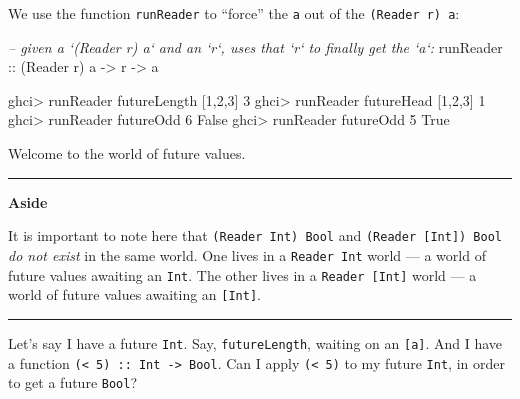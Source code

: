 \documentclass[]{article}
\newenvironment{Shaded}{}{}
\newcommand{\DataTypeTok}[1]{\textcolor[rgb]{0.56,0.13,0.00}{#1}}
\newcommand{\DecValTok}[1]{\textcolor[rgb]{0.25,0.63,0.44}{#1}}
\newcommand{\CommentTok}[1]{\textcolor[rgb]{0.38,0.63,0.69}{\textit{#1}}}
\newcommand{\OtherTok}[1]{\textcolor[rgb]{0.00,0.44,0.13}{#1}}
\newcommand{\FunctionTok}[1]{\textcolor[rgb]{0.02,0.16,0.49}{#1}}
\newcommand{\NormalTok}[1]{#1}
\begin{document}
We use the function \texttt{runReader} to ``force'' the \texttt{a} out of the
\texttt{(Reader\ r)\ a}:

\begin{Shaded}
\begin{Highlighting}[]
\CommentTok{-- given a `(Reader r) a` and an `r`, uses that `r` to finally get the `a`:}
\OtherTok{runReader ::}\NormalTok{ (}\DataTypeTok{Reader}\NormalTok{ r) a }\OtherTok{->}\NormalTok{ r }\OtherTok{->}\NormalTok{ a}
\end{Highlighting}
\end{Shaded}

\begin{Shaded}
\begin{Highlighting}[]
\NormalTok{ghci}\FunctionTok{>}\NormalTok{ runReader futureLength [}\DecValTok{1}\NormalTok{,}\DecValTok{2}\NormalTok{,}\DecValTok{3}\NormalTok{]}
\DecValTok{3}
\NormalTok{ghci}\FunctionTok{>}\NormalTok{ runReader futureHead [}\DecValTok{1}\NormalTok{,}\DecValTok{2}\NormalTok{,}\DecValTok{3}\NormalTok{]}
\DecValTok{1}
\NormalTok{ghci}\FunctionTok{>}\NormalTok{ runReader futureOdd }\DecValTok{6}
\DataTypeTok{False}
\NormalTok{ghci}\FunctionTok{>}\NormalTok{ runReader futureOdd }\DecValTok{5}
\DataTypeTok{True}
\end{Highlighting}
\end{Shaded}

Welcome to the world of future values.

\begin{center}\rule{0.5\linewidth}{\linethickness}\end{center}

\textbf{Aside}

It is important to note here that \texttt{(Reader\ Int)\ Bool} and
\texttt{(Reader\ {[}Int{]})\ Bool} \emph{do not exist} in the same world. One
lives in a \texttt{Reader\ Int} world --- a world of future values awaiting an
\texttt{Int}. The other lives in a \texttt{Reader\ {[}Int{]}} world --- a world
of future values awaiting an \texttt{{[}Int{]}}.

\begin{center}\rule{0.5\linewidth}{\linethickness}\end{center}

Let's say I have a future \texttt{Int}. Say, \texttt{futureLength}, waiting on
an \texttt{{[}a{]}}. And I have a function
\texttt{(\textless{}\ 5)\ ::\ Int\ -\textgreater{}\ Bool}. Can I apply
\texttt{(\textless{}\ 5)} to my future \texttt{Int}, in order to get a future
\texttt{Bool}?
\end{document}
